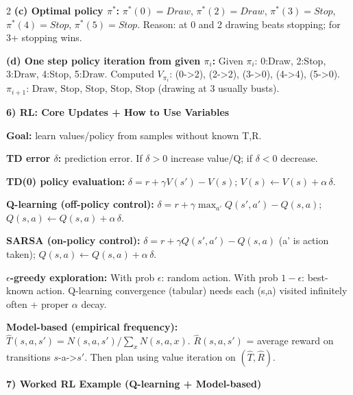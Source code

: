 \documentclass[10pt]{article}
\begin{document}
\begin{multicols*}{2}
\textbf{(c) Optimal policy $\pi^*$:}\newline
$\pi^*(0)=Draw$, $\pi^*(2)=Draw$, $\pi^*(3)=Stop$, $\pi^*(4)=Stop$, $\pi^*(5)=Stop$.\newline
Reason: at 0 and 2 drawing beats stopping; for 3+ stopping wins.

\textbf{(d) One step policy iteration from given $\pi_i$:}\newline
Given $\pi_i$: 0:Draw, 2:Stop, 3:Draw, 4:Stop, 5:Draw.\newline
Computed $V_{\pi_i}$: (0->2), (2->2), (3->0), (4->4), (5->0).\newline
$\pi_{i+1}$: Draw, Stop, Stop, Stop, Stop (drawing at 3 usually busts).

\textbf{6) RL: Core Updates + How to Use Variables}

\textbf{Goal:} learn values/policy from samples without known T,R.

\textbf{TD error $\delta$:} prediction error. If $\delta>0$ increase value/Q; if $\delta<0$ decrease.

\textbf{TD(0) policy evaluation:}\newline
$\delta = r + \gamma V(s') - V(s)$; \; $V(s) \leftarrow V(s) + \alpha\,\delta$.

\textbf{Q-learning (off-policy control):}\newline
$\delta = r + \gamma \max_{a'} Q(s',a') - Q(s,a)$; \; $Q(s,a) \leftarrow Q(s,a) + \alpha\,\delta$.

\textbf{SARSA (on-policy control):}\newline
$\delta = r + \gamma Q(s',a') - Q(s,a)$ (a' is action taken);\newline
$Q(s,a) \leftarrow Q(s,a) + \alpha\,\delta$.

\textbf{$\epsilon$-greedy exploration:}\newline
With prob $\epsilon$: random action. With prob $1-\epsilon$: best-known action.\newline
Q-learning convergence (tabular) needs each (s,a) visited infinitely often + proper $\alpha$ decay.

\textbf{Model-based (empirical frequency):}\newline
$\hat{T}(s,a,s') = N(s,a,s') / \sum_x N(s,a,x)$.\newline
$\hat{R}(s,a,s')$ = average reward on transitions $s$-a->$s'$.\newline
Then plan using value iteration on $(\hat{T},\hat{R})$.

\textbf{7) Worked RL Example (Q-learning + Model-based)}


\end{multicols*}
\end{document}
